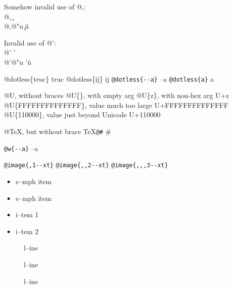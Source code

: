 \documentclass{book}
\begin{document}
\begin{titlepage}
Somehow invalid use of @,:\leavevmode{}\\
@, \c{}
\leavevmode{}\\
@,@"u \c{}\"{u}

Invalid use of @':\leavevmode{}\\
@' \'{}
\leavevmode{}\\
@'@"u \'{}\"{u}

@dotless\{truc\} truc
@dotless\{ij\} ij
\texttt{@dotless\{{-}{-}a\}} --a
\texttt{@dotless\{a\}} a

@U, without braces @U\{\}, with empty arg 
@U\{z\}, with non-hex arg U+z
@U\{FFFFFFFFFFFFFF\}, value much too large U+FFFFFFFFFFFFFF
@U\{110000\}, value just beyond Unicode U+110000

@TeX, but without brace \TeX{}\texttt{@\#} \#

\texttt{@w\{{-}{-}a\}} \hbox{--a}

\texttt{@image\{,1{-}{-}xt\}} 
\texttt{@image\{,,2{-}{-}xt\}} 
\texttt{@image\{,,,3{-}{-}xt\}} 


\begin{itemize}[label=\emph{}]
\item e--mph item
\end{itemize}

\begin{itemize}[label=\emph{} after emph]
\item e--mph item
\end{itemize}

\begin{itemize}[label=\textbullet{} a--n itemize line]
\item i--tem 1
\item i--tem 2
\end{itemize}

\begin{description}
\item[{\parbox[b]{\linewidth}{%
a}}]
l--ine
\end{description}

\begin{description}
\item[{\parbox[b]{\linewidth}{%
a--missing style formatting}}]
l--ine
\end{description}

\begin{description}
\item[{\parbox[b]{\linewidth}{%
a\\
\index[fn]{a@\texttt{a}}%
\index[cp]{index entry between item and itemx}%
b
\index[fn]{b@\texttt{b}}%
}}]
l--ine
\end{description}


\end{titlepage}
\end{document}
